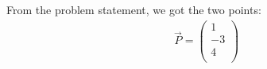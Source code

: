 %      

From the problem statement, we got the two points:\\

\begin{equation}
\begin{aligned}
      \vec{P} = \begin{pmatrix}
      1\\ 
      -3\\
      4\\
  
    \end{pmatrix}
\end{aligned}
\end{equation}

